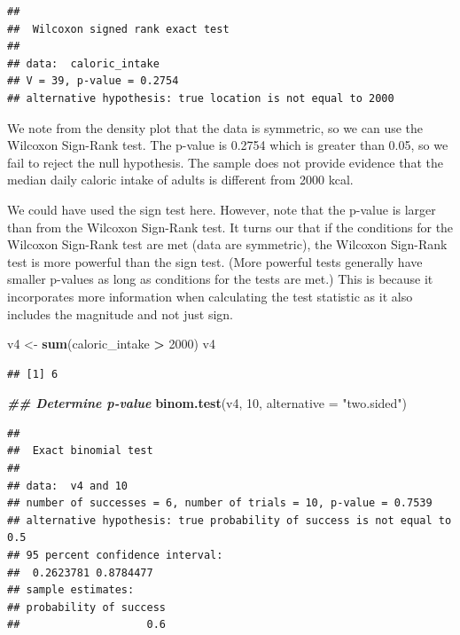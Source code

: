 \documentclass[
]{book}
\newenvironment{Shaded}{\begin{snugshade}}{\end{snugshade}}
\newcommand{\AttributeTok}[1]{\textcolor[rgb]{0.13,0.29,0.53}{#1}}
\newcommand{\DecValTok}[1]{\textcolor[rgb]{0.00,0.00,0.81}{#1}}
\newcommand{\DocumentationTok}[1]{\textcolor[rgb]{0.56,0.35,0.01}{\textbf{\textit{#1}}}}
\newcommand{\FunctionTok}[1]{\textcolor[rgb]{0.13,0.29,0.53}{\textbf{#1}}}
\newcommand{\NormalTok}[1]{#1}
\newcommand{\OtherTok}[1]{\textcolor[rgb]{0.56,0.35,0.01}{#1}}
\newcommand{\SpecialCharTok}[1]{\textcolor[rgb]{0.81,0.36,0.00}{\textbf{#1}}}
\newcommand{\StringTok}[1]{\textcolor[rgb]{0.31,0.60,0.02}{#1}}
\theoremstyle{definition}
\theoremstyle{definition}
\theoremstyle{definition}
\theoremstyle{definition}
\theoremstyle{remark}
\begin{document}
\begin{verbatim}
## 
##  Wilcoxon signed rank exact test
## 
## data:  caloric_intake
## V = 39, p-value = 0.2754
## alternative hypothesis: true location is not equal to 2000
\end{verbatim}

We note from the density plot that the data is symmetric, so we can use the Wilcoxon Sign-Rank test. The p-value is 0.2754 which is greater than 0.05, so we fail to reject the null hypothesis. The sample does not provide evidence that the median daily caloric intake of adults is different from 2000 kcal.

We could have used the sign test here. However, note that the p-value is larger than from the Wilcoxon Sign-Rank test. It turns our that if the conditions for the Wilcoxon Sign-Rank test are met (data are symmetric), the Wilcoxon Sign-Rank test is more powerful than the sign test. (More powerful tests generally have smaller p-values as long as conditions for the tests are met.) This is because it incorporates more information when calculating the test statistic as it also includes the magnitude and not just sign.

\begin{Shaded}
\begin{Highlighting}[]
\NormalTok{v4 }\OtherTok{\textless{}{-}} \FunctionTok{sum}\NormalTok{(caloric\_intake }\SpecialCharTok{\textgreater{}} \DecValTok{2000}\NormalTok{)}
\NormalTok{v4}
\end{Highlighting}
\end{Shaded}

\begin{verbatim}
## [1] 6
\end{verbatim}

\begin{Shaded}
\begin{Highlighting}[]
\DocumentationTok{\#\# Determine p{-}value}
\FunctionTok{binom.test}\NormalTok{(v4, }\DecValTok{10}\NormalTok{, }\AttributeTok{alternative =} \StringTok{"two.sided"}\NormalTok{)}
\end{Highlighting}
\end{Shaded}

\begin{verbatim}
## 
##  Exact binomial test
## 
## data:  v4 and 10
## number of successes = 6, number of trials = 10, p-value = 0.7539
## alternative hypothesis: true probability of success is not equal to 0.5
## 95 percent confidence interval:
##  0.2623781 0.8784477
## sample estimates:
## probability of success 
##                    0.6
\end{verbatim}
\end{document}

